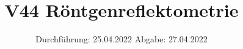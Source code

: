 

\subject{Fortgeschrittenenpraktikum}
\title{V44 Röntgenreflektometrie}
\date{%
  Durchführung: 25.04.2022
  \hspace{3em}
  Abgabe: 27.04.2022
}



\maketitle
\thispagestyle{empty}
\tableofcontents
\newpage






%

\printbibliography{}




